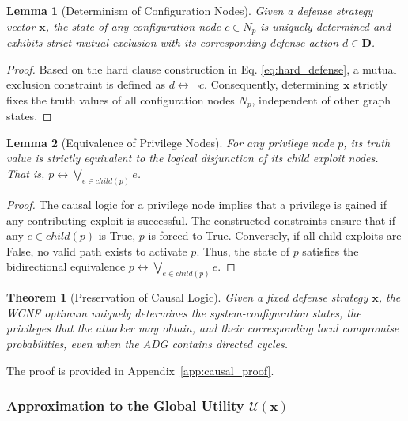 \documentclass[conference]{IEEEtran}
\theoremstyle{definition} %
\theoremstyle{plain} %
\newtheorem{theorem}{Theorem}
\newtheorem{lemma}{Lemma}
\begin{document}
\begin{lemma}[Determinism of Configuration Nodes]
\label{lemma:config_determinism}
Given a defense strategy vector $\mathbf{x}$, the state of any configuration node $c \in N_p$ is uniquely determined and exhibits strict mutual exclusion with its corresponding defense action $d \in \mathbf{D}$.
\end{lemma}

\begin{proof}
Based on the hard clause construction in Eq. \eqref{eq:hard_defense}, a mutual exclusion constraint is defined as $d \leftrightarrow \neg c$. Consequently, determining $\mathbf{x}$ strictly fixes the truth values of all configuration nodes $N_p$, independent of other graph states.
\end{proof}

\begin{lemma}[Equivalence of Privilege Nodes]
\label{lemma:privilege_equivalence}
For any privilege node $p$, its truth value is strictly equivalent to the logical disjunction of its child exploit nodes. That is, $p \leftrightarrow \bigvee_{e \in child(p)} e$.
\end{lemma}

\begin{proof}
The causal logic for a privilege node implies that a privilege is gained if any contributing exploit is successful. The constructed constraints ensure that if any $e \in child(p)$ is True, $p$ is forced to True. Conversely, if all child exploits are False, no valid path exists to activate $p$. Thus, the state of $p$ satisfies the bidirectional equivalence $p \leftrightarrow \bigvee_{e \in child(p)} e$.
\end{proof}

\begin{theorem}[Preservation of Causal Logic]
\label{thm:preservation}
Given a fixed defense strategy $\mathbf{x}$, the WCNF optimum uniquely determines the system-configuration states, the privileges that the attacker may obtain, and their corresponding local compromise probabilities, even when the ADG contains directed cycles.
\end{theorem}

\noindent The proof is provided in Appendix~\ref{app:causal_proof}.

\subsubsection{Approximation to the Global Utility $\mathcal{U}(\mathbf{x})$}
\end{document}
